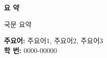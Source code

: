 \newpage

\thispagestyle{plain}
\begin{center}
    \Large
    \textbf{요 약}
\end{center}

국문 요약


\textbf{주요어:} 주요어1, 주요어2, 주요어3\\

\textbf{학 번:} 0000-00000
